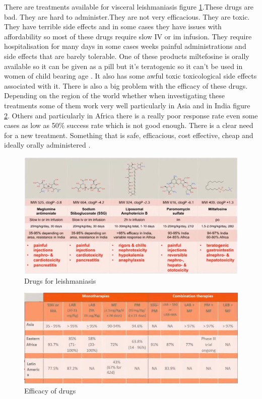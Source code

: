 \documentclass[10pt,twocolumn,letterpaper]{article}
\begin{document}
There are treatments available for visceral leishmaniasis figure \ref{fig:drugs_lesh}.These drugs are bad. They are hard to administer.They are not very efficacious. They are toxic. They have terrible side effects and in some cases they have issues with affordability so most of these drugs require slow IV or im infusion. They require hospitalisation for many days in some cases weeks painful administrations and side effects that are barely tolerable\cite{Arya2013}. One of these products miltefosine is orally available so it can be given as a pill but it's teratogenic so it can't be used in women of child bearing age \cite{Dorlo2012}. It also has some awful toxic toxicological side effects associated with it. There is also a big problem with the efficacy of these drugs. Depending on the region of the world whether when investigating these treatments some of them work very well particularly in Asia and in India figure \ref{fig:drugs1_lesh}. Others and particularly in Africa there is a really poor response rate even some cases as low as 50$\%$ success rate which is not good enough. There is a clear need for a new treatment. Something that is safe, efficacious, cost effective, cheap and ideally orally administered \cite{Chappuis2007}.



\begin{figure}[h!]
  \includegraphics[width=\linewidth]{drugs_lesh.png}
  \caption{Drugs for leishmaniasis}
  \label{fig:drugs_lesh}
\end{figure}



\begin{figure}[h!]
  \includegraphics[width=\linewidth]{drugs1_lesh.png}
  \caption{Efficacy of drugs }
  \label{fig:drugs1_lesh}
\end{figure}
\end{document}
